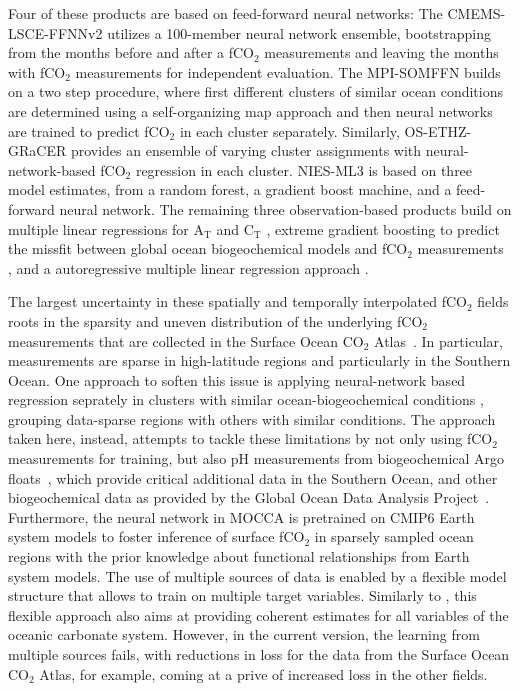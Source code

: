 \documentclass{article}
\begin{document}
	Four of these products are based on feed-forward neural networks: The CMEMS-LSCE-FFNNv2 \citep{chau2022} utilizes a 100-member neural network ensemble,  bootstrapping from the months before and after a fCO$_2$ measurements and leaving the months with fCO$_2$ measurements for independent evaluation. The MPI-SOMFFN \citep{landschuetzer2016} builds on a two step procedure, where first different clusters of similar ocean conditions are determined using a self-organizing map approach and then neural networks are trained to predict fCO$_2$ in each cluster separately. Similarly, OS-ETHZ-GRaCER \citep{gregor2021} provides an ensemble of varying cluster assignments with neural-network-based fCO$_2$ regression in each cluster. NIES-ML3 \citep{zeng2022} is based on three model estimates, from a random forest, a gradient boost machine, and a feed-forward neural network. The remaining three observation-based products build on multiple linear regressions for A$_\text{T}$ and C$_\text{T}$ \citep[fundamental variables to calculate fCO$_2$ and other carbonate system variables; JMA-MLR;][]{iida2021}, extreme gradient boosting to predict the missfit between global ocean biogeochemical models and fCO$_2$ measurements \citep[LDEO-HPD;][]{gloege2022}, and a autoregressive multiple linear regression approach \citep[Jena-MLS;][]{roedenbeck2022}.
	
	The largest uncertainty in these spatially and temporally interpolated fCO$_2$ fields roots in the sparsity and uneven distribution of the underlying fCO$_2$ measurements that are collected in the Surface Ocean CO$_2$ Atlas~\citep{bakker2016}. In particular, measurements are sparse in high-latitude regions and particularly in the Southern Ocean. One approach to soften this issue is applying neural-network based regression seprately in clusters with similar ocean-biogeochemical conditions \citep{landschuetzer2016,gregor2021}, grouping data-sparse regions with others with similar conditions. The approach taken here, instead, attempts to tackle these limitations by not only using fCO$_2$ measurements for training, but also pH measurements from biogeochemical Argo floats~\citep{johnson2017}, which provide critical additional data in the Southern Ocean, and other biogeochemical data as provided by the Global Ocean Data Analysis Project~\citep[GLODAPv2;][]{olsen2016}. Furthermore, the neural network in MOCCA is pretrained on CMIP6 Earth system models to foster inference of surface fCO$_2$ in sparsely sampled ocean regions with the prior knowledge about functional relationships from Earth system models. The use of multiple sources of data is enabled by a flexible model structure that allows to train on multiple target variables. Similarly to \cite{iida2021}, this flexible approach also aims at providing coherent estimates for all variables of the oceanic carbonate system. However, in the current version, the learning from multiple sources fails, with reductions in loss for the data from the Surface Ocean CO$_2$ Atlas, for example, coming at a prive of increased loss in the other fields.
	
\end{document}
